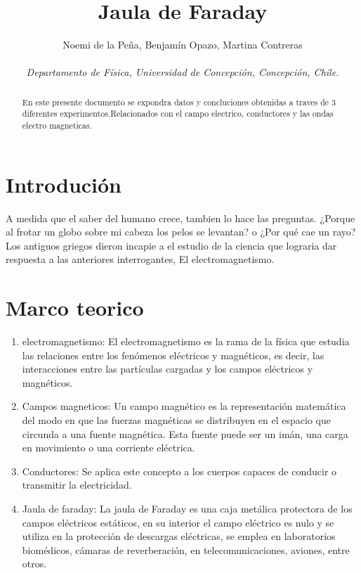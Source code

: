 \documentclass[]{article}
\title{Jaula de Faraday}
\author{Noemi de la Peña, Benjamín Opazo, Martina Contreras \\ \\
 \textit{ Departamento de Física, Universidad de Concepción, Concepción, Chile. }}
\date{}
\begin{document}
\maketitle 

\begin{multicols*}{2}[\setlength{columnsep}{3cm}]

    


\begin{abstract}
    En este presente documento se expondra datos y concluciones 
obtenidas a traves de 3 diferentes experimentos.Relacionados con el campo electrico,
conductores y las ondas electro magneticas.
\end{abstract}


\section*{Introdución}
    A medida que el saber del humano crece, tambien lo hace las preguntas.
    ¿Porque al frotar un globo sobre mi cabeza los pelos se levantan? o 
    ¿Por qué cae un rayo?
    Los antiguos griegos dieron incapie a el estudio de la ciencia que 
    lograria dar respuesta a las anteriores interrogantes, El electromagnetismo.

\section*{Marco teorico}
\begin{enumerate}
    \item electromagnetismo: El electromagnetismo es la rama de la física que estudia las relaciones entre los fenómenos eléctricos y magnéticos, es decir, las interacciones entre las partículas cargadas y los campos eléctricos y magnéticos.
    
    \item Campos magneticos: Un campo magnético es la representación matemática del modo en que las fuerzas magnéticas se distribuyen en el espacio que circunda a una fuente magnética. Esta fuente puede ser un imán, una carga en movimiento o una corriente eléctrica.
    
    \item Conductores: Se aplica este concepto a los cuerpos capaces de conducir o transmitir la electricidad.
    
    \item Jaula de faraday: La jaula de Faraday es una caja metálica protectora de los campos eléctricos estáticos, en su interior el campo eléctrico es nulo y se utiliza en la protección de descargas eléctricas, se emplea en laboratorios biomédicos, cámaras de reverberación, en telecomunicaciones, aviones, entre otros.
    

\end{enumerate}
\end{multicols*}
\end{document}
